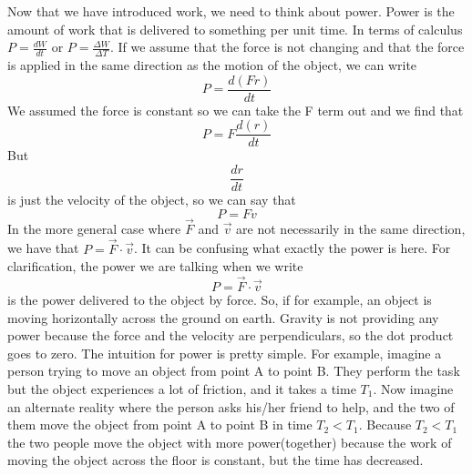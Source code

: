 Now that we have introduced work, we need to think about power. Power is the amount of work that is delivered to something per unit time. In terms of calculus $P=\frac{dW}{dt}$ or $P = \frac{\Delta W}{\Delta T}$. If we assume that the force is not changing and that the force is applied in the same direction as the motion of the object, we can write $$P=\frac{d\left(Fr\right)}{dt}$$ We assumed the force is constant so we can take the F term out and we find that $$P=F\frac{d\left(r\right)}{dt}$$ But $$\frac{dr}{dt}$$ is just the velocity of the object, so we can say that $$P=Fv$$ In the more general case where $\vec{F}$ and $\vec{v}$ are not necessarily in the same direction, we have that $P=\vec{F}\cdot \vec{v}$. It can be confusing what exactly the power is here. For clarification, the power we are talking when we write \begin{equation}P=\vec{F} \cdot \vec{v}\end{equation} is the power delivered to the object by force. So, if for example, an object is moving horizontally across the ground on earth. Gravity is not providing any power because the force and the velocity are perpendiculars, so the dot product goes to zero. The intuition for power is pretty simple. For example, imagine a person trying to move an object from point A to point B. They perform the task but the object experiences a lot of friction, and it takes a time $T_1$. Now imagine an alternate reality where the person asks his/her friend to help, and the two of them move the object from point A to point B in time $T_2<T_1$. Because $T_2<T_1$ the two people move the object with more power(together) because the work of moving the object across the floor is constant, but the time has decreased. 